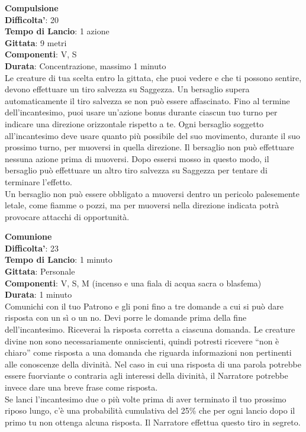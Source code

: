 \begin{multicols}{2}
\medskip\textbf{Compulsione}\\
\textbf{Difficolta'}: 20\\
\textbf{Tempo di Lancio}: 1 azione\\
\textbf{Gittata}: 9 metri\\
\textbf{Componenti}: V, S\\
\textbf{Durata}: Concentrazione, massimo 1 minuto\\
Le creature di tua scelta entro la gittata, che puoi vedere e che ti possono sentire, devono effettuare un tiro salvezza su Saggezza. Un bersaglio supera automaticamente il tiro salvezza se non può essere affascinato. Fino al termine dell’incantesimo, puoi usare un’azione bonus durante ciascun tuo turno per indicare una direzione orizzontale rispetto a te. Ogni bersaglio soggetto all’incantesimo deve usare quanto più possibile del suo movimento, durante il suo prossimo turno, per muoversi in quella direzione. Il bersaglio non può effettuare nessuna azione prima di muoversi. Dopo essersi mosso in questo modo, il bersaglio può effettuare un altro tiro salvezza su Saggezza per tentare di terminare l’effetto.\\
Un bersaglio non può essere obbligato a muoversi dentro un pericolo palesemente letale, come fiamme o pozzi, ma per muoversi nella direzione indicata potrà provocare attacchi di opportunità.

\medskip\textbf{Comunione}\\
\textbf{Difficolta'}: 23\\
\textbf{Tempo di Lancio}: 1 minuto\\
\textbf{Gittata}: Personale\\
\textbf{Componenti}: V, S, M (incenso e una fiala di acqua sacra o blasfema)\\
\textbf{Durata}: 1 minuto\\
Comunichi con il tuo Patrono e gli poni fino a tre domande a cui si può dare risposta con un sì o un no. Devi porre le domande prima della fine dell’incantesimo. Riceverai la risposta corretta a ciascuna domanda. Le creature divine non sono necessariamente onniscienti, quindi potresti ricevere “non è chiaro” come risposta a una domanda che riguarda informazioni non pertinenti alle conoscenze della divinità. Nel caso in cui una risposta di una parola potrebbe essere fuorviante o contraria agli interessi della divinità, il Narratore potrebbe invece dare una breve frase come risposta.\\
Se lanci l’incantesimo due o più volte prima di aver terminato il tuo prossimo riposo lungo, c’è una probabilità cumulativa del 25\% che per ogni lancio dopo il primo tu non ottenga alcuna risposta. Il Narratore effettua questo tiro in segreto.


\end{multicols}
